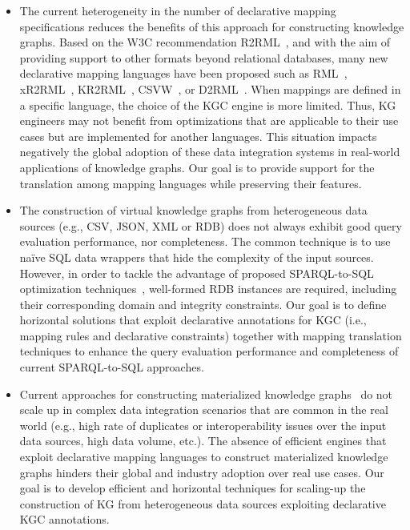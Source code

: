 \begin{itemize}
    \item The current heterogeneity in the number of declarative mapping specifications reduces the benefits of this approach for constructing knowledge graphs. Based on the W3C recommendation R2RML~\citep{R2RML}, and with the aim of providing support to other formats beyond relational databases, many new declarative mapping languages have been proposed such as RML~\citep{dimou2014rml}, xR2RML~\citep{michel2015translation}, KR2RML~\citep{slepicka2015kr2rml}, CSVW~\citep{tennison2015model}, or D2RML~\citep{chortaras2018mapping}. When mappings are defined in a specific language, the choice of the KGC engine is more limited. Thus, KG engineers may not benefit from optimizations that are applicable to their use cases but are implemented for another languages. This situation impacts negatively the global adoption of these data integration systems in real-world applications of knowledge graphs. Our goal is to provide support for the translation among mapping languages while preserving their features.

    \item The construction of virtual knowledge graphs from heterogeneous data sources (e.g., CSV, JSON, XML or RDB) does not always exhibit good query evaluation performance, nor completeness. The common technique is to use na\"ive SQL data wrappers that hide the complexity of the input sources. However, in order to tackle the advantage of proposed SPARQL-to-SQL optimization techniques~\citep{priyatna2014formalisation,calvanese2017ontop}, well-formed RDB instances are required, including their corresponding domain and integrity constraints. Our goal is to define horizontal solutions that exploit declarative annotations for KGC (i.e., mapping rules and declarative constraints) together with mapping translation techniques to enhance the query evaluation performance and completeness of current SPARQL-to-SQL approaches.

    \item Current approaches for constructing materialized knowledge graphs~\citep{csimcsek2019rocketrml,lefranccois2017sparql} do not scale up in complex data integration scenarios that are common in the real world (e.g., high rate of duplicates or interoperability issues over the input data sources, high data volume, etc.). The absence of efficient engines that exploit declarative mapping languages to construct materialized knowledge graphs hinders their global and industry adoption over real use cases. Our goal is to develop efficient and horizontal techniques for scaling-up the construction of KG from heterogeneous data sources exploiting declarative KGC annotations.
\end{itemize}

